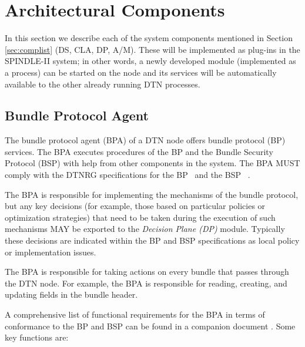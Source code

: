 \documentclass[11pt]{article}
\begin{document}
\newpage
\section{Architectural Components} \label{sec:compdesc}

In this section we describe each of the system components mentioned in Section
\ref{sec:complist} (DS, CLA, DP, A/M). These will be implemented as plug-ins in
the SPINDLE-II system; in other words, a newly developed module (implemented as
a process) can be started on the node and its services will be automatically
available to the other already running DTN processes.


\subsection{Bundle Protocol Agent}
\label{sec:bpa}

The bundle protocol agent (BPA) of a DTN node offers bundle protocol (BP)
services.  The BPA executes procedures of the BP and the Bundle Security
Protocol (BSP) with help from other components in the system.  The BPA MUST
comply with the DTNRG specifications for the BP~\cite{BP-ID} and the BSP
~\cite{BSP-ID}.  

The BPA is responsible for implementing the mechanisms of the bundle protocol,
but any key decisions (for example, those based on particular policies or
optimization strategies) that need to be taken during the execution of such
mechanisms MAY be exported to the {\em Decision Plane (DP)} module.  Typically
these decisions are indicated within the BP and BSP specifications as local
policy or implementation issues.

The BPA is responsible for taking actions on every bundle that passes through 
the DTN node.   For example, the BPA is responsible for reading, creating, 
and updating fields in the bundle header.

A comprehensive list of functional requirements for the BPA in terms of
conformance to the BP and BSP can be found in a companion document \cite{MJ}.
Some key functions are:
\end{document}
